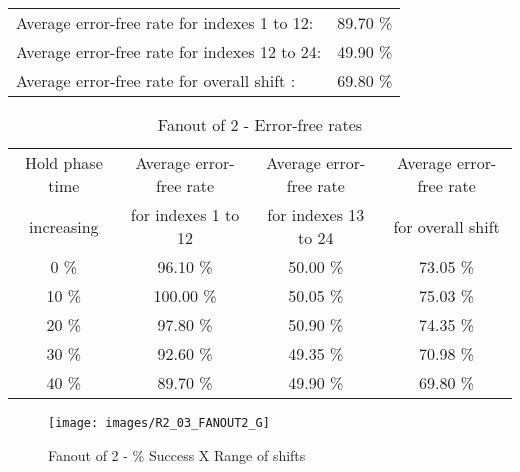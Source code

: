 \begin{table}[h]
\begin{center}
\begin{tabular}{|c|c|c|c|c|}
\end{tabular}


\flushleft
\begin{tabular}{l l}
Average error-free rate for indexes  1 to 12: &  89.70 \% \\
Average error-free rate for indexes 12 to 24: &  49.90 \% \\
Average error-free rate for overall shift   : &  69.80 \% \\

\end{tabular}


\end{center}
\end{table}



\begin{table}[h]
\begin{center}
\caption{Fanout of 2 - Error-free rates}
\begin{tabular}{|c|c|c|c|}
\hline
Hold phase time   & Average error-free rate  & Average error-free rate  & Average error-free rate  \\
increasing & for indexes  1 to 12 & for indexes 13 to 24 & for overall shift \\
\hline
0  \% &  96.10 \% & 50.00 \% & 73.05 \% \\
\hline
10 \% &  100.00 \% & 50.05 \% & 75.03 \% \\
\hline
20 \% & 97.80 \% & 50.90 \% & 74.35 \% \\
\hline
30 \% & 92.60 \% & 49.35 \% & 70.98 \% \\
\hline
40 \% & 89.70 \% & 49.90 \% & 69.80 \% \\
\hline


\end{tabular}

\end{center}
\end{table}


\pagebreak
\begin{figure}[h!]
\center
\texttt{[image: images/R2\_03\_FANOUT2\_G]}
\caption{Fanout of 2 -  \% Success X Range of shifts}
\label{figure:Fanout2_reg_gt1}
\end{figure}


